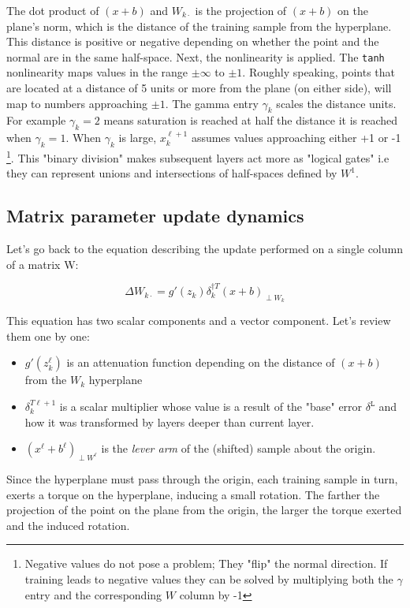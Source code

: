 \documentclass[]{article}
\begin{document}
	 	The dot product of $(x+b)$ and $W_{k \cdot}$ is the projection of $(x+b)$  on the plane's norm, which is the distance of the training sample from the hyperplane. This distance is positive or negative depending on whether the point and the normal are in the same half-space. Next, the nonlinearity is applied. The \texttt{tanh} nonlinearity maps values in the range $\pm \infty$ to $\pm 1$. Roughly speaking, points that are located at a distance of 5 units or more from the plane (on either side), will map to numbers approaching $\pm1$. The gamma entry $\gamma_k$ scales the distance units. For example $\gamma_k=2$ means saturation is reached at half the distance it is reached when $\gamma_k=1$. When $\gamma_k$ is large, $x^{\ell+1}_k$ assumes values approaching either +1 or -1
	 	\footnote{ Negative values do not pose a problem; They "flip" the normal direction. If training leads to negative values they can be solved by multiplying both the $\gamma$ entry and the corresponding $W$ column by -1}. This "binary division" makes subsequent layers act more as "logical gates" i.e they can represent unions and intersections of half-spaces defined by $W^1$.
	 	
	 \subsection{Matrix parameter update dynamics}
	 	Let's go back to the equation describing the update performed on a single column of a matrix W:
	 	
			$$\Delta W_{k\cdot}  = g'(z_k)  \delta^{\dagger T}_k (x+b)_{\perp W_k}$$
	 	
	 	This equation has two scalar components and a vector component. Let's review them one by one:
	 	
	  	\begin{itemize}
	  		\item $g'(z^{\ell}_k)$ is an attenuation function depending on the distance of $(x+b)$ from the $W_k$ hyperplane
	  		\item  $\delta^{T\ell+1}_k$ is a scalar multiplier whose value is a result of the "base" error $\delta^\mathtt{L}$ and how it was transformed by layers deeper than current layer. 
	  		\item $(x^{\ell}+b^{\ell})_{\perp W^\ell}$ is the \textit{lever arm} of the (shifted) sample about the origin.
	  	\end{itemize}
		
 		Since the hyperplane must pass through the origin, each training sample in turn, exerts a torque on the hyperplane, inducing a small rotation. The farther the projection of the point on the plane from the origin, the larger the torque exerted and the induced rotation.  
 		
\end{document}
